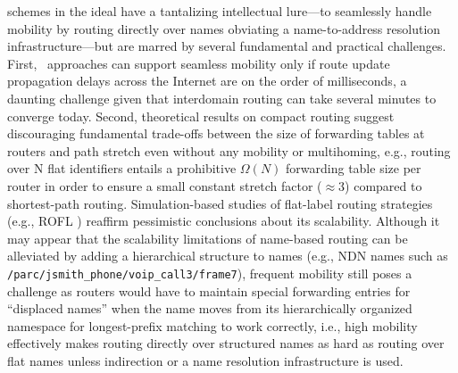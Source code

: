 {\textbf \Namerouting} schemes in the ideal have a tantalizing intellectual lure---to seamlessly handle mobility by routing directly over names obviating a name-to-address resolution infrastructure---but are marred by several fundamental and practical challenges. First, \namerouting\ approaches can support seamless mobility only if route update propagation delays across the Internet are on the order of milliseconds, a daunting challenge given that interdomain routing can take several minutes to converge today. Second, theoretical results on compact routing \cite{compact-routing} suggest discouraging fundamental trade-offs between the size of forwarding tables at routers and path stretch even without any mobility or multihoming, e.g.,  routing over N flat identifiers entails a prohibitive $\Omega(N)$ forwarding table size per router in order to ensure a small constant stretch factor ($\approx$3) compared to shortest-path routing. Simulation-based studies of flat-label routing strategies (e.g., ROFL \cite{ROFL}) reaffirm pessimistic conclusions about its scalability. Although it may appear that the scalability limitations of name-based routing can be alleviated by adding a hierarchical structure to names \cite{TRIAD, DONA, CCN} (e.g., NDN \cite{CCN} names such as  \verb+/parc/jsmith_phone/voip_call3/frame7+), frequent mobility still poses a challenge as routers would have to maintain special forwarding entries for ``displaced names'' when the name moves from its hierarchically organized namespace for longest-prefix matching to work correctly, i.e., high mobility effectively makes routing directly over structured names as hard as routing over flat names unless indirection or a name resolution infrastructure is used.


